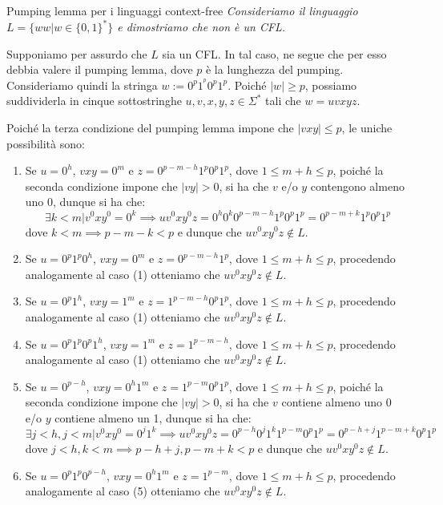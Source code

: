 \begin{Example}{Pumping lemma per i linguaggi context-free}{}
\textit{Consideriamo il linguaggio $L = \{ww | w \in \{0, 1\}^*\}$ e dimostriamo che non è un CFL.}

Supponiamo per assurdo che $L$ sia un CFL. In tal caso, ne segue che per esso debbia valere il pumping lemma, dove $p$ è la lunghezza del pumping. Consideriamo quindi la stringa $w := 0^p1^^p0^p1^p$. Poiché $|w| \geq p$, possiamo suddividerla in cinque sottostringhe $u, v, x, y, z \in\Sigma^*$ tali che $w = uvxyz$. 

Poiché la terza condizione del pumping lemma impone che $|vxy| \leq p$, le uniche possibilità sono:
\begin{enumerate}
    \item Se $u = 0^h$, $vxy = 0^m$ e $z = 0^{p-m-h}1^p0^p1^p$, dove $1 \leq m + h \leq p$, poiché la seconda condizione impone che $|vy| > 0$, si ha che $v$ e/o $y$ contengono almeno uno 0, dunque si ha che: 
    \begin{equation*}
    \exists k < m | v^0xy^0 = 0^k \implies uv^0xy^0z = 0^h0^k0^{p-m-h}1^p0^p1^p = 0^{p-m+k}1^p0^p1^p        
    \end{equation*}
    dove $k < m \implies p - m - k < p$ e dunque che $uv^0xy^0z \notin L$.
    \item Se $u = 0^p1^p0^h$, $vxy = 0^m$ e $z = 0^{p-m-h}1^p$, dove $1 \leq m+h \leq p$, procedendo analogamente al caso (1) otteniamo che $uv^0xy^0z \notin L$.
    \item Se $u = 0^p1^h$, $vxy = 1^m$ e $z = 1^{p-m-h}0^p1^p$, dove $1 \leq m+h \leq p$, procedendo analogamente al caso (1) otteniamo che $uv^0xy^0z \notin L$.
    \item Se $u = 0^p1^p0^p1^h$, $vxy = 1^m$ e $z = 1^{p-m-h}$, dove $1 \leq m+h \leq p$, procedendo analogamente al caso (1) otteniamo che $uv^0xy^0z \notin L$.
    \item Se $u = 0^{p-h}$, $vxy = 0^h1^m$ e $z = 1^{p-m}0^p1^p$, dove $1 \leq m + h \leq p$, poiché la seconda condizione impone che $|vy| > 0$, si ha che $v$ contiene almeno uno 0 e/o $y$ contiene almeno un 1, dunque si ha che:
    \begin{equation*}
        \exists j < h, j < m | v^0xy^0 = 0^j1^k \implies uv^0xy^0z = 0^{p-h}0^j1^k1^{p-m}0^p1^p = 0^{p-h+j}1^{p-m+k}0^p1^p
    \end{equation*}
    dove $j < h, k < m \implies p-h+j, p-m+k < p$ e dunque che $uv^0xy^0z \notin L$.
    \item Se $u = 0^p1^p0^{p-h}$, $vxy = 0^h1^m$ e $z = 1^{p-m}$, dove $1 \leq m+h \leq p$, procedendo analogamente al caso (5) otteniamo che $uv^0xy^0z \notin L$.

\end{enumerate}
\end{Example}

